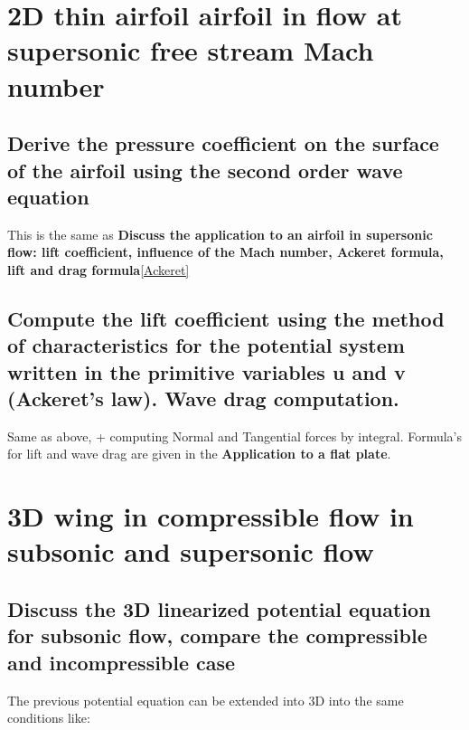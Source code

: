 \documentclass[british,french,11pt, a4paper, openany]{article}
\begin{document}

\section{2D thin airfoil airfoil in flow at supersonic free stream Mach number}
\subsection{Derive the pressure coefficient on the surface of the airfoil using the second	order wave equation}
This is the same as \og\textbf{Discuss the application to an airfoil in supersonic flow: lift coefficient, influence of the Mach number, Ackeret formula, lift and drag formula}\fg\ref{Ackeret}

\subsection{Compute the lift coefficient using the method of characteristics for the	potential system written in the primitive variables u and v (Ackeret’s law). Wave drag computation.}
Same as above, + computing Normal and Tangential forces by integral. Formula's for lift and wave drag are given in the \textbf{Application to a flat plate}.




\section{3D wing in compressible flow in subsonic and supersonic flow}
\subsection{Discuss the 3D linearized potential equation for subsonic flow, compare the	compressible and incompressible case}
The previous potential equation can be extended into 3D into the same conditions like: 
\end{document}
